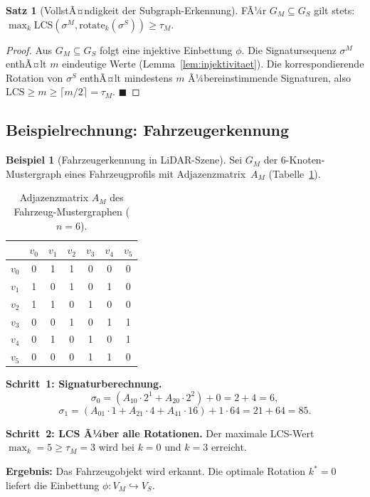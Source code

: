 ﻿\documentclass[a4paper,12pt]{article}
\theoremstyle{definition}
\newtheorem{beispiel}{Beispiel}[section]
\newtheorem{satz}{Satz}[section]
\begin{document}
\begin{satz}[VollstÃ¤ndigkeit der Subgraph-Erkennung]
  \label{satz:vollstaendigkeit}
  FÃ¼r $G_M \subseteq G_S$ gilt stets:
  $\max_{k} \mathrm{LCS}(\sigma^M, \mathrm{rotate}_k(\sigma^S))
  \geq \tau_M$.
\end{satz}

\begin{proof}
  Aus $G_M \subseteq G_S$ folgt eine injektive Einbettung $\phi$.
  Die Signatursequenz $\sigma^M$ enthÃ¤lt $m$ eindeutige Werte
  (Lemma~\ref{lem:injektivitaet}). Die korrespondierende Rotation
  von $\sigma^S$ enthÃ¤lt mindestens $m$ Ã¼bereinstimmende Signaturen,
  also $\mathrm{LCS} \geq m \geq \lceil m/2 \rceil = \tau_M$.
  \hfill$\blacksquare$
\end{proof}

\subsection{Beispielrechnung: Fahrzeugerkennung}

\begin{beispiel}[Fahrzeugerkennung in LiDAR-Szene]
  \label{bsp:fahrzeug}
  Sei $G_M$ der 6-Knoten-Mustergraph eines Fahrzeugprofils mit
  Adjazenzmatrix~$A_M$ (Tabelle~\ref{tab:adjazenz}).

  \begin{table}[htbp]
    \centering
    \caption{Adjazenzmatrix $A_M$ des Fahrzeug-Mustergraphen ($n=6$).}
    \label{tab:adjazenz}
    \begin{tabular}{@{}ccccccc@{}}
      \toprule
         & $v_0$ & $v_1$ & $v_2$ & $v_3$ & $v_4$ & $v_5$ \\
      \midrule
      $v_0$ & 0 & 1 & 1 & 0 & 0 & 0 \\
      $v_1$ & 1 & 0 & 1 & 0 & 1 & 0 \\
      $v_2$ & 1 & 1 & 0 & 1 & 0 & 0 \\
      $v_3$ & 0 & 0 & 1 & 0 & 1 & 1 \\
      $v_4$ & 0 & 1 & 0 & 1 & 0 & 1 \\
      $v_5$ & 0 & 0 & 0 & 1 & 1 & 0 \\
      \bottomrule
    \end{tabular}
  \end{table}

  \textbf{Schritt~1: Signaturberechnung.}
  \[
    \sigma_0 = (A_{10}\cdot 2^1 + A_{20}\cdot 2^2) + 0 = 2+4 = 6,
  \]
  \[
    \sigma_1 = (A_{01}\cdot 1 + A_{21}\cdot 4 + A_{41}\cdot 16)
               + 1 \cdot 64 = 21 + 64 = 85.
  \]

  \textbf{Schritt~2: LCS Ã¼ber alle Rotationen.}
  Der maximale LCS-Wert $\max_k = 5 \geq \tau_M = 3$ wird
  bei $k = 0$ und $k = 3$ erreicht.

  \textbf{Ergebnis:} Das Fahrzeugobjekt wird erkannt.
  Die optimale Rotation $k^* = 0$ liefert die Einbettung
  $\phi: V_M \hookrightarrow V_S$.
\end{beispiel}
\end{document}
